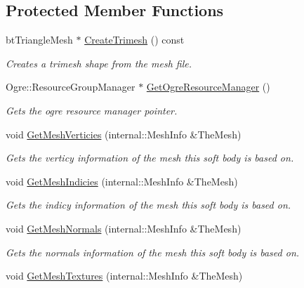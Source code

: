 \subsection*{Protected Member Functions}
\begin{DoxyCompactItemize}
\item 
btTriangleMesh $\ast$ \hyperlink{classphys_1_1ActorBase_af869b78fcac01ee153d495953daab382}{CreateTrimesh} () const 
\begin{DoxyCompactList}\small\item\em Creates a trimesh shape from the mesh file. \item\end{DoxyCompactList}\item 
Ogre::ResourceGroupManager $\ast$ \hyperlink{classphys_1_1ActorBase_afa9b5a1f149182a96a7608f52847b7ed}{GetOgreResourceManager} ()
\begin{DoxyCompactList}\small\item\em Gets the ogre resource manager pointer. \item\end{DoxyCompactList}\item 
void \hyperlink{classphys_1_1ActorBase_a795d9d132ed55fa114f15039dcad9055}{GetMeshVerticies} (internal::MeshInfo \&TheMesh)
\begin{DoxyCompactList}\small\item\em Gets the verticy information of the mesh this soft body is based on. \item\end{DoxyCompactList}\item 
void \hyperlink{classphys_1_1ActorBase_acc1e51ff56ec8c9320bcbd4c3cec3f34}{GetMeshIndicies} (internal::MeshInfo \&TheMesh)
\begin{DoxyCompactList}\small\item\em Gets the indicy information of the mesh this soft body is based on. \item\end{DoxyCompactList}\item 
void \hyperlink{classphys_1_1ActorBase_a6f6c1ede5fdf787bcc3f34feddacebff}{GetMeshNormals} (internal::MeshInfo \&TheMesh)
\begin{DoxyCompactList}\small\item\em Gets the normals information of the mesh this soft body is based on. \item\end{DoxyCompactList}\item 
void \hyperlink{classphys_1_1ActorBase_a91c1bd400e1cf0e35682a506aebb7f38}{GetMeshTextures} (internal::MeshInfo \&TheMesh)

\end{DoxyCompactItemize}
